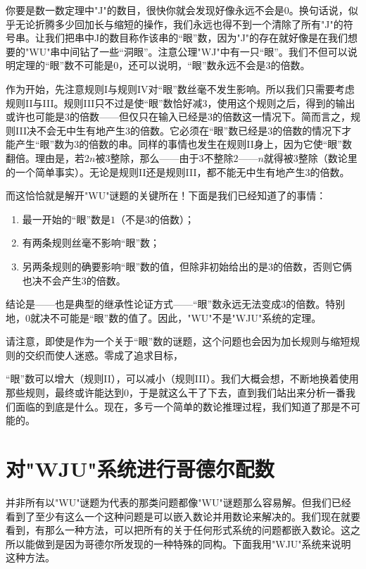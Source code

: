 你要是数一数定理中"J"的数目，很快你就会发现好像永远不会是$0$。换句话说，似乎无论折腾多少回加长与缩短的操作，我们永远也得不到一个清除了所有"J"的符号串。让我们把串中J的数目称作该串的“眼”数，因为"J"的存在就好像是在我们想要的"WU"串中间钻了一些“洞眼”。注意公理"WJ"中有一只“眼”。我们不但可以说明定理的“眼”数不可能是$0$，还可以说明，“眼”数永远不会是$3$的倍数。

作为开始，先注意规则I与规则IV对“眼”数丝毫不发生影响。所以我们只需要考虑规则II与III。规则III只不过是使“眼”数恰好减$3$，使用这个规则之后，得到的输出或许也可能是3的倍数——但仅只在输入已经是$3$的倍数这一情况下。简而言之，规则III决不会无中生有地产生$3$的倍数。它必须在“眼”数已经是$3$的倍数的情况下才能产生“眼”数为$3$的倍数的串。同样的事情也发生在规则II身上，因为它使“眼”数翻倍。理由是，若$2n$被$3$整除，那么——由于$3$不整除$2$——$n$就得被$3$整除（数论里的一个简单事实）。无论是规则II还是规则III，都不能无中生有地产生$3$的倍数。

而这恰恰就是解开"WU"谜题的关键所在！下面是我们已经知道了的事情：
\begin{enumerate}
\item  最一开始的“眼”数是$1$（不是$3$的倍数）；
\item 有两条规则丝毫不影响“眼”数；
\item 另两条规则的确要影响“眼”数的值，但除非初始给出的是$3$的倍数，否则它俩也决不会产生$3$的倍数。
\end{enumerate}

结论是——也是典型的继承性论证方式——“眼”数永远无法变成$3$的倍数。特别地，$0$就决不可能是“眼”数的值了。因此，"WU"不是"WJU"系统的定理。

请注意，即使是作为一个关于“眼”数的谜题，这个问题也会因为加长规则与缩短规则的交织而使人迷惑。零成了追求目标，

“眼”数可以增大（规则II），可以减小（规则III）。我们大概会想，不断地换着使用那些规则，最终或许能达到$0$，于是就这么干了下去，直到我们站出来分析一番我们面临的到底是什么。现在，多亏一个简单的数论推理过程，我们知道了那是不可能的。

\section{对"WJU"系统进行哥德尔配数}

并非所有以"WU"谜题为代表的那类问题都像"WU"谜题那么容易解。但我们已经看到了至少有这么一个这种问题是可以嵌入数论并用数论来解决的。我们现在就要看到，有那么一种方法，可以把所有的关于任何形式系统的问题都嵌入数论。这之所以能做到是因为哥德尔所发现的一种特殊的同构。下面我用"WJU"系统来说明这种方法。

